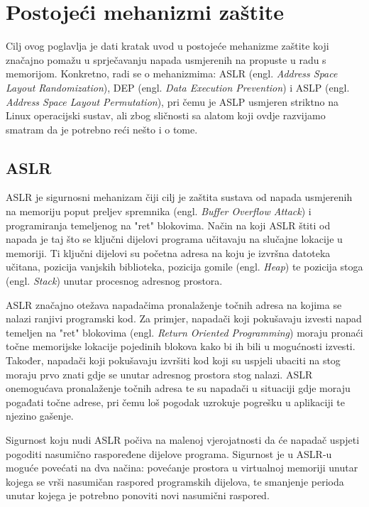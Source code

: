 \documentclass[times, utf8, diplomski, numeric]{fer}
\begin{document}
\chapter{Postojeći mehanizmi zaštite}

Cilj ovog poglavlja je dati kratak uvod u postojeće mehanizme
zaštite koji značajno pomažu u sprječavanju napada usmjerenih na
propuste u radu s memorijom. Konkretno, radi se o mehanizmima: ASLR (engl. 
\emph{Address Space Layout Randomization}), DEP (engl. \emph{Data
Execution Prevention}) i ASLP (engl. \emph{Address Space Layout
Permutation}), pri čemu je ASLP usmjeren striktno na Linux
operacijski sustav, ali zbog sličnosti sa alatom koji ovdje
razvijamo smatram da je potrebno reći nešto i o tome. 

\section{ASLR}
\label{sct:aslr}

ASLR je sigurnosni mehanizam čiji cilj je zaštita sustava od
napada usmjerenih na memoriju poput preljev spremnika (engl. 
\emph{Buffer Overflow Attack}) i programiranja temeljenog na
"ret" blokovima. Način na koji ASLR štiti od napada je taj što se
ključni dijelovi programa učitavaju na slučajne lokacije u
memoriji. Ti ključni dijelovi su početna adresa na koju je
izvršna datoteka učitana, pozicija vanjskih biblioteka, pozicija
gomile (engl. \emph{Heap}) te pozicija stoga (engl. \emph{Stack}) 
unutar procesnog adresnog prostora.

ASLR značajno otežava napadačima pronalaženje točnih adresa na
kojima se nalazi ranjivi programski kod. Za primjer, napadači
koji pokušavaju izvesti napad temeljen na "ret" blokovima 
(engl. \emph{Return Oriented Programming}) \citep{rop_official} 
moraju pronaći točne memorijske lokacije pojedinih blokova kako
bi ih bili u mogućnosti izvesti. Također, napadači koji
pokušavaju izvršiti kod koji su uspjeli ubaciti na stog moraju
prvo znati gdje se unutar adresnog prostora stog nalazi. ASLR
onemogućava pronalaženje točnih adresa te su napadači u situaciji
gdje moraju pogađati točne adrese, pri čemu loš pogodak uzrokuje
pogrešku u aplikaciji te njezino gašenje.

Sigurnost koju nudi ASLR počiva na malenoj vjerojatnosti da će
napadač uspjeti pogoditi nasumično raspoređene dijelove programa.
Sigurnost je u ASLR-u moguće povećati na dva načina: povećanje
prostora u virtualnoj memoriji unutar kojega se vrši nasumičan
raspored programskih dijelova, te smanjenje perioda unutar kojega
je potrebno ponoviti novi nasumični raspored. 
\end{document}
